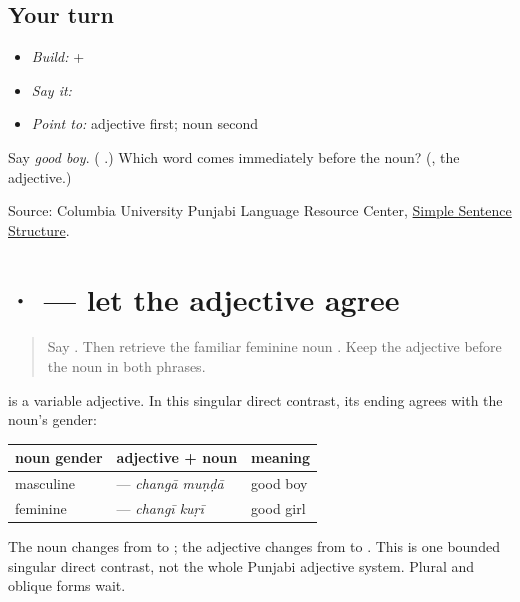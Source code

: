 \subsection*{Your turn}
\begin{itemize}
\raggedright
  \item \emph{Build:} \textbf{} + \textbf{}
  \item \emph{Say it:} \textbf{ }
  \item \emph{Point to:} adjective \textbf{} first; noun \textbf{} second
\end{itemize}

\begin{tcolorbox}[breakable,colback=teal!4,colframe=teal!35!black,title={Before you move on}]
Say \emph{good boy}. (\textbf{ }.) Which word comes immediately before the noun? (\textbf{}, the adjective.)

Source: Columbia University Punjabi Language Resource Center, \href{https://punjabi.lrc.columbia.edu/?page\_id=101}{Simple Sentence Structure}.
\end{tcolorbox}
\section[\texorpdfstring{\pa{ਚੰਗਾ} \pa{ਮੁੰਡਾ} · \pa{ਚੰਗੀ} \pa{ਕੁੜੀ} (changa munda …)}{ਚੰਗਾ ਮੁੰਡਾ · ਚੰਗੀ ਕੁੜੀ (changa munda …)}]{  ·   — let the adjective agree}

\label{lesson:PA-C177-adjective-agreement}



\begin{quote}
Say \textbf{ }. Then retrieve the familiar feminine noun \textbf{}. Keep the adjective before the noun in both phrases.
\end{quote}

\begin{grammarlens}[title={Grammar Lens: change the adjective ending}]
\textbf{} is a variable adjective. In this singular direct contrast, its ending agrees with the noun's gender:

\noindent
\begin{tabularx}{\linewidth}{@{}>{\raggedright\arraybackslash}X>{\raggedright\arraybackslash}X>{\raggedright\arraybackslash}X@{}}
\toprule
\textbf{noun gender} & \textbf{adjective + noun} & \textbf{meaning} \\
\midrule
masculine & \textbf{\pa{ਚੰਗਾ} \pa{ਮੁੰਡਾ}} — \emph{changā muṇḍā} & good boy \\
feminine & \textbf{\pa{ਚੰਗੀ} \pa{ਕੁੜੀ}} — \emph{changī kuṛī} & good girl \\
\bottomrule
\end{tabularx}

The noun changes from \textbf{} to \textbf{}; the adjective changes from \textbf{} to \textbf{}. This is one bounded singular direct contrast, not the whole Punjabi adjective system. Plural and oblique forms wait.
\end{grammarlens}

